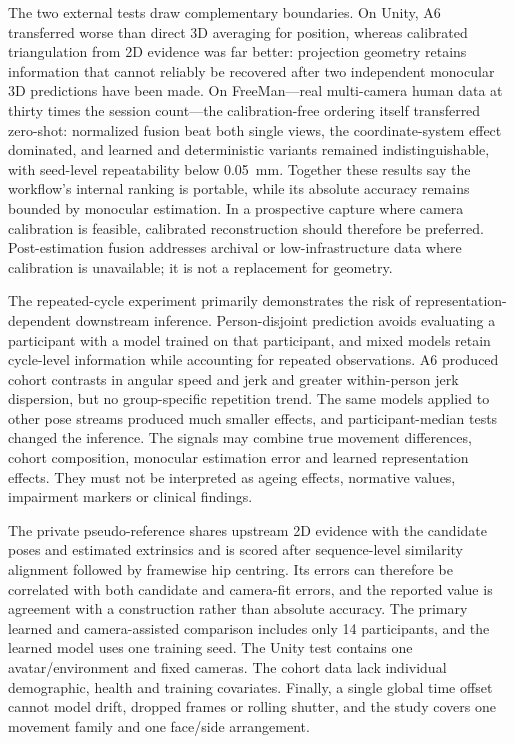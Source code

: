 \documentclass[lineno,pdflatex,sn-mathphys-num]{sn-jnl}
\begin{document}
The two external tests draw complementary boundaries. On Unity, A6
transferred worse than direct 3D averaging for position, whereas calibrated
triangulation from 2D evidence was far better: projection geometry retains
information that cannot reliably be recovered after two independent monocular
3D predictions have been made. On FreeMan---real multi-camera human data at
thirty times the session count---the calibration-free ordering itself
transferred zero-shot: normalized fusion beat both single views, the
coordinate-system effect dominated, and learned and deterministic variants
remained indistinguishable, with seed-level repeatability below 0.05~mm.
Together these results say the workflow's internal ranking is portable, while
its absolute accuracy remains bounded by monocular estimation. In a
prospective capture where camera calibration is feasible, calibrated
reconstruction should therefore be preferred. Post-estimation fusion addresses
archival or low-infrastructure data where calibration is unavailable; it is
not a replacement for geometry.

The repeated-cycle experiment primarily demonstrates the risk of
representation-dependent downstream inference. Person-disjoint prediction
avoids evaluating a participant with a model trained on that participant, and
mixed models retain cycle-level information while accounting for repeated
observations. A6 produced cohort contrasts in angular speed and jerk and
greater within-person jerk dispersion, but no group-specific repetition trend.
The same models applied to other pose streams produced much smaller effects,
and participant-median tests changed the inference. The signals may combine
true movement differences, cohort composition, monocular estimation error and
learned representation effects. They must not be interpreted as ageing effects,
normative values, impairment markers or clinical findings.

The private pseudo-reference shares upstream 2D evidence with the candidate
poses and estimated extrinsics and is scored after sequence-level similarity
alignment followed by framewise hip centring. Its errors can therefore be
correlated with both candidate and camera-fit errors, and the reported value is
agreement with a construction rather than absolute accuracy. The primary
learned and camera-assisted comparison includes only 14 participants, and the
learned model uses one training seed. The Unity
test contains one avatar/environment and fixed cameras. The cohort data lack
individual demographic, health and training covariates. Finally, a single
global time offset cannot model drift, dropped frames or rolling shutter, and
the study covers one movement family and one face/side arrangement.
\end{document}
